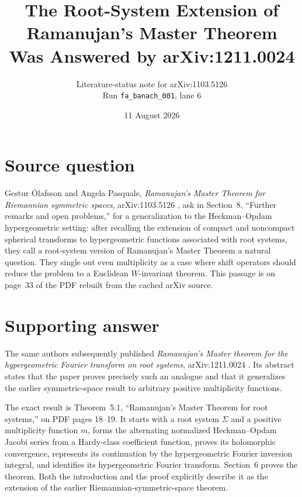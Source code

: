 \documentclass[11pt]{article}
\title{The Root-System Extension of Ramanujan's Master Theorem\\
Was Answered by arXiv:1211.0024}
\author{Literature-status note for arXiv:1103.5126\\
Run \texttt{fa\_banach\_001}, lane 6}
\date{11 August 2026}
\begin{document}
\maketitle

\begin{center}
\end{center}

\section*{Source question}

Gestur Ólafsson and Angela Pasquale,
\emph{Ramanujan's Master Theorem for Riemannian symmetric spaces},
arXiv:1103.5126 \cite{source}, ask in Section~8, ``Further remarks and open
problems,'' for a generalization to the Heckman--Opdam hypergeometric setting:
after recalling the extension of compact and noncompact spherical transforms
to hypergeometric functions associated with root systems, they call a
root-system version of Ramanujan's Master Theorem a natural question.  They
single out even multiplicity as a case where shift operators should reduce the
problem to a Euclidean $W$-invariant theorem.  This passage is on page~33 of
the PDF rebuilt from the cached arXiv source.

\section*{Supporting answer}

The same authors subsequently published
\emph{Ramanujan's Master theorem for the hypergeometric Fourier transform on
root systems}, arXiv:1211.0024 \cite{answer}.  Its abstract states that the
paper proves precisely such an analogue and that it generalizes the earlier
symmetric-space result to arbitrary positive multiplicity functions.

The exact result is Theorem~5.1, ``Ramanujan's Master Theorem for root
systems,'' on PDF pages 18--19.  It starts with a root system $\Sigma$ and a
positive multiplicity function $m$, forms the alternating normalized
Heckman--Opdam Jacobi series from a Hardy-class coefficient function, proves
its holomorphic convergence, represents its continuation by the
hypergeometric Fourier inversion integral, and identifies its hypergeometric
Fourier transform.  Section~6 proves the theorem.  Both the introduction and
the proof explicitly describe it as the extension of the earlier
Riemannian-symmetric-space theorem.
\end{document}
